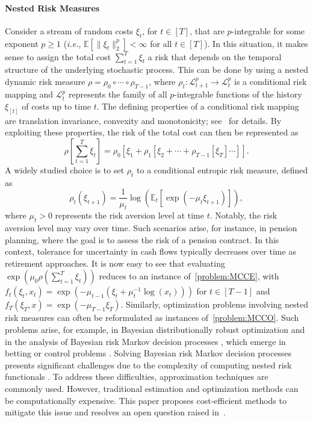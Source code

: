 \documentclass[11pt]{article}
\begin{document}
\paragraph{Nested Risk Measures}
\label{sec:application_nested_risk}
Consider a stream of random costs $\xi_t$, for $t \in [T]$, that are $p$-integrable for some exponent $p \geq 1$ ({\em i.e.}, $\mathbb{E}[\|\xi_t\|^p_2] < \infty$ for all $t \in [T]$). In this situation, it makes sense to assign the total cost $\sum_{t=1}^T \xi_t$ a risk that depends on the temporal structure of the underlying stochastic process. This can be done by using a nested dynamic risk measure $\rho = \rho_0 \circ \cdots \circ \rho_{T-1}$, where $\rho_t: \mathcal{L}^p_{t+1} \to \mathcal{L}^p_t$ is a conditional risk mapping and $\mathcal{L}^p_t$ represents the family of all $p$-integrable functions of the history $\xi_{[t]}$ of costs up to time $t$. The defining properties of a conditional risk mapping are translation invariance, convexity and monotonicity; see~\cite{ruszczynski2006conditional} for details. By exploiting these properties, the risk of the total cost can then be represented as
\begin{equation*}
    \rho\left[ {\textstyle\sum_{t=1}^T \xi_t }\right] = \rho_0\left[ \xi_1 + \rho_1\left[ \xi_2 + \cdots +\rho_{T-1}[\xi_T] \cdots\right] \right].  
\end{equation*}
A widely studied choice is to set $\rho_t$ to a conditional entropic risk measure, defined as
\[
    \rho_{t}(\xi_{t+1}) = \frac{1}{{\mu}_{t}} \log\left(\mathbb{E}_{t}[\exp(-{\mu}_{t} \xi_{t+1} )] \right),
\]
where $\mu_t > 0$ represents the risk aversion level at time $t$. Notably, the risk aversion level may vary over time. Such scenarios arise, for instance, in pension planning, where the goal is to assess the risk of a pension contract. In this context, tolerance for uncertainty in cash flows typically decreases over time as retirement approaches. It is now easy to see that evaluating $\exp(\mu_0 \rho(\sum_{t=1}^T \xi_t))$ reduces to an instance of~\eqref{problem:MCCE}, with $f_t(\xi_t,x_t)=\exp(-\mu_{t-1} (\xi_t + \mu_{t}^{-1} \log(x_t)))$ for $t\in[T-1]$ and $f_T(\xi_T,x)=\exp(-\mu_{T-1} \xi_T)$. Similarly, optimization problems involving nested risk measures can often be reformulated as instances of~\eqref{problem:MCCO}. Such problems arise, for example, in Bayesian distributionally robust optimization \citep{shapiro2023bayesian} and in the analysis of Bayesian risk Markov decision processes \citep{lin2022bayesian}, which emerge in betting or control problems \citep{lin2022bayesian, wang2024bayesian}. Solving Bayesian risk Markov decision processes presents significant challenges due to the complexity of computing nested risk functionals \citep{lin2022bayesian}. To address these difficulties, approximation techniques are commonly used. However, traditional estimation and optimization methods can be computationally expensive. This paper proposes cost-efficient methods to mitigate this issue and resolves an open question raised in~\cite{lin2022bayesian}.
\end{document}
